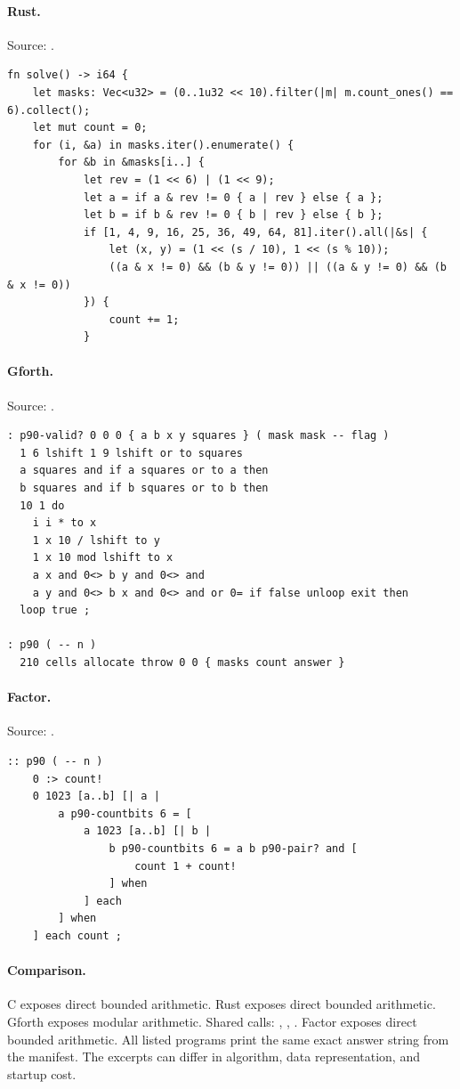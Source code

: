 \paragraph{Rust.} Source: .
\begin{lstlisting}
fn solve() -> i64 {
    let masks: Vec<u32> = (0..1u32 << 10).filter(|m| m.count_ones() == 6).collect();
    let mut count = 0;
    for (i, &a) in masks.iter().enumerate() {
        for &b in &masks[i..] {
            let rev = (1 << 6) | (1 << 9);
            let a = if a & rev != 0 { a | rev } else { a };
            let b = if b & rev != 0 { b | rev } else { b };
            if [1, 4, 9, 16, 25, 36, 49, 64, 81].iter().all(|&s| {
                let (x, y) = (1 << (s / 10), 1 << (s % 10));
                ((a & x != 0) && (b & y != 0)) || ((a & y != 0) && (b & x != 0))
            }) {
                count += 1;
            }
\end{lstlisting}

\paragraph{Gforth.} Source: .
\begin{lstlisting}
: p90-valid? 0 0 0 { a b x y squares } ( mask mask -- flag )
  1 6 lshift 1 9 lshift or to squares
  a squares and if a squares or to a then
  b squares and if b squares or to b then
  10 1 do
    i i * to x
    1 x 10 / lshift to y
    1 x 10 mod lshift to x
    a x and 0<> b y and 0<> and
    a y and 0<> b x and 0<> and or 0= if false unloop exit then
  loop true ;

: p90 ( -- n )
  210 cells allocate throw 0 0 { masks count answer }
\end{lstlisting}

\paragraph{Factor.} Source: .
\begin{lstlisting}
:: p90 ( -- n )
    0 :> count!
    0 1023 [a..b] [| a |
        a p90-countbits 6 = [
            a 1023 [a..b] [| b |
                b p90-countbits 6 = a b p90-pair? and [
                    count 1 + count!
                ] when
            ] each
        ] when
    ] each count ;
\end{lstlisting}

\paragraph{Comparison.}
C exposes direct bounded arithmetic. Rust exposes direct bounded arithmetic. Gforth exposes modular arithmetic. Shared calls: \texttt{}, \texttt{}, \texttt{}. Factor exposes direct bounded arithmetic.
All listed programs print the same exact answer string from the manifest. The excerpts can differ in algorithm, data representation, and startup cost.

